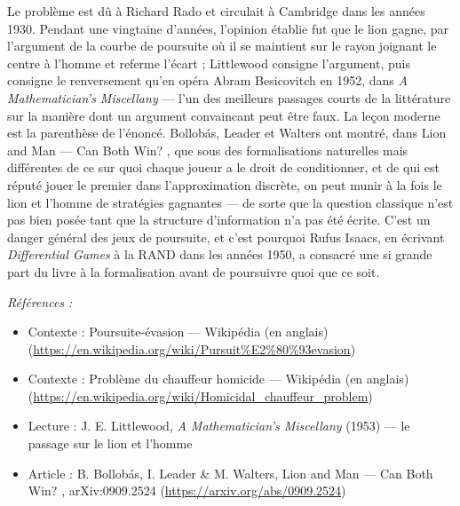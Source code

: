 \documentclass[11pt]{article}
\newenvironment{refs}{\par\small\noindent\emph{Références :}\begin{itemize}\setlength\itemsep{0pt}}{\end{itemize}\normalsize}
\begin{document}
\noindent Le problème est dû à Richard Rado et circulait à Cambridge dans les années
1930. Pendant une vingtaine d'années, l'opinion établie fut que le lion gagne, par l'argument
de la \og{} courbe de poursuite \fg{} où il se maintient sur le rayon joignant le centre à l'homme et
referme l'écart ; Littlewood consigne l'argument, puis consigne le renversement qu'en opéra
Abram Besicovitch en 1952, dans \textit{A Mathematician's Miscellany} --- l'un des meilleurs
passages courts de la littérature sur la manière dont un argument convaincant peut être faux.
La leçon moderne est la parenthèse de l'énoncé. Bollobás, Leader et Walters ont montré, dans
\og{} Lion and Man --- Can Both Win? \fg{}, que sous des formalisations naturelles mais différentes de
ce sur quoi chaque joueur a le droit de conditionner, et de qui est réputé jouer le premier
dans l'approximation discrète, on peut munir à la fois le lion et l'homme de stratégies
gagnantes --- de sorte que la question classique n'est pas bien posée tant que la structure
d'information n'a pas été écrite. C'est un danger général des jeux de poursuite, et c'est
pourquoi Rufus Isaacs, en écrivant \textit{Differential Games} à la RAND dans les années 1950,
a consacré une si grande part du livre à la formalisation avant de poursuivre quoi que ce
soit.

\begin{refs}
\item Contexte : Poursuite-évasion --- Wikipédia (en anglais) (\url{https://en.wikipedia.org/wiki/Pursuit%E2%80%93evasion})
\item Contexte : Problème du chauffeur homicide --- Wikipédia (en anglais) (\url{https://en.wikipedia.org/wiki/Homicidal_chauffeur_problem})
\item Lecture : J. E. Littlewood, \textit{A Mathematician's Miscellany} (1953) --- le passage sur le lion et l'homme
\item Article : B. Bollobás, I. Leader \& M. Walters, \og{} Lion and Man --- Can Both Win? \fg{}, arXiv:0909.2524 (\url{https://arxiv.org/abs/0909.2524})
\end{refs}

\bigskip
\end{document}
